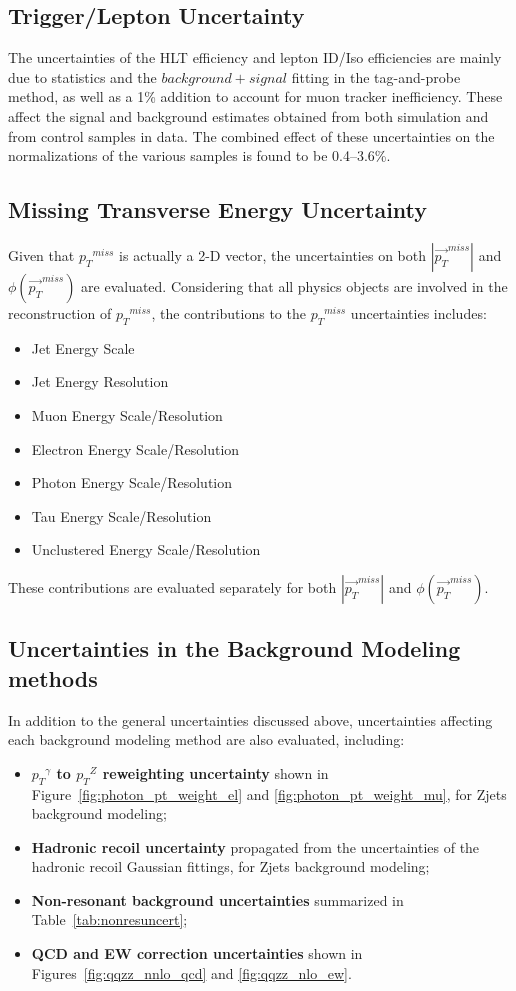 \subsection{Trigger/Lepton Uncertainty}
The uncertainties of the HLT efficiency and lepton ID/Iso efficiencies are mainly due to statistics and the $background+signal$ fitting in the tag-and-probe method, as well as a 1\% addition to account for muon tracker inefficiency. These affect the signal and background estimates obtained from both simulation and from control samples in data. The combined effect of these uncertainties on the normalizations of the various samples is found to be 0.4--3.6\%.

\subsection{Missing Transverse Energy Uncertainty}
Given that ${p_{T}}^{miss}$ is actually a 2-D vector, the uncertainties on both $|{\vec{p_{T}}^{miss}}|$ and $\phi({\vec{p_{T}}}^{miss})$ are evaluated. Considering that all physics objects are involved in the reconstruction of ${p_{T}}^{miss}$, the contributions to the ${p_{T}}^{miss}$ uncertainties includes:
\begin{itemize}
\item Jet Energy Scale
\item Jet Energy Resolution
\item Muon Energy Scale/Resolution
\item Electron Energy Scale/Resolution
\item Photon Energy Scale/Resolution
\item Tau Energy Scale/Resolution
\item Unclustered Energy Scale/Resolution
\end{itemize}

These contributions are evaluated separately for both $|{\vec{p_{T}}^{miss}}|$ and $\phi({\vec{p_{T}}}^{miss})$.
\subsection{Uncertainties in the Background Modeling methods}
In addition to the general uncertainties discussed above, uncertainties affecting each background modeling method are also evaluated, including:
\begin{itemize}
\item \textbf{${p_T}^{\gamma}$ to ${p_T}^Z$ reweighting uncertainty} shown in Figure~\ref{fig:photon_pt_weight_el} and \ref{fig:photon_pt_weight_mu}, for Zjets background modeling;
\item \textbf{Hadronic recoil uncertainty} propagated from the uncertainties of the hadronic recoil Gaussian fittings, for Zjets background modeling;
\item \textbf{Non-resonant background uncertainties} summarized in Table~\ref{tab:nonresuncert};
\item \textbf{QCD and EW correction uncertainties} shown in Figures~\ref{fig:qqzz_nnlo_qcd} and \ref{fig:qqzz_nlo_ew}.
\end{itemize}

